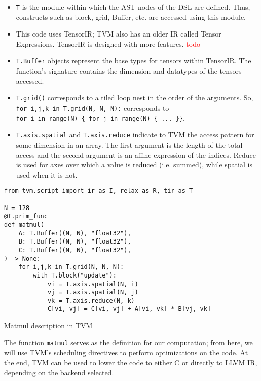 \documentclass[acmsmall, nonacm=true]{acmart}
\begin{document}
\begin{itemize}
\item \verb|T| is the module within which the AST nodes of the DSL are defined. Thus, constructs such as block, grid, Buffer, etc. are accessed using this module.
\item This code uses TensorIR; TVM also has an older IR called Tensor Expressions. TensorIR is designed with more features. \textcolor{red}{todo}
\item \verb|T.Buffer| objects represent the base types for tensors within TensorIR. The function's signature contains the dimension and datatypes of the tensors accessed.
\item \verb|T.grid()| corresponds to a tiled loop nest in the order of the arguments. So, \verb|for i,j,k in T.grid(N, N, N):| corresponds to\\ \verb|for i in range(N) { for j in range(N) { ... }}|.
\item \verb|T.axis.spatial| and \verb|T.axis.reduce| indicate to TVM the access pattern for some dimension in an array. The first argument is the length of the total access and the second argument is an affine expression of the indices. Reduce is used for axes over which a value is reduced (i.e. summed), while spatial is used when it is not. 
\end{itemize}


\begin{listing}
    \centering
    \begin{verbatim}
from tvm.script import ir as I, relax as R, tir as T

N = 128
@T.prim_func
def matmul(
    A: T.Buffer((N, N), "float32"),
    B: T.Buffer((N, N), "float32"),
    C: T.Buffer((N, N), "float32"),
) -> None:
    for i,j,k in T.grid(N, N, N):
        with T.block("update"):
            vi = T.axis.spatial(N, i)
            vj = T.axis.spatial(N, j)
            vk = T.axis.reduce(N, k)
            C[vi, vj] = C[vi, vj] + A[vi, vk] * B[vj, vk]
    \end{verbatim}
    \caption{Matmul description in TVM}
    \label{lst:tvm_matmul_base}
\end{listing}

The function \verb|matmul| serves as the definition for our computation; from here, we will use TVM's scheduling directives to perform optimizations on the code. At the end, TVM can be used to lower the code to either C or directly to LLVM IR, depending on the backend selected. 
\end{document}
